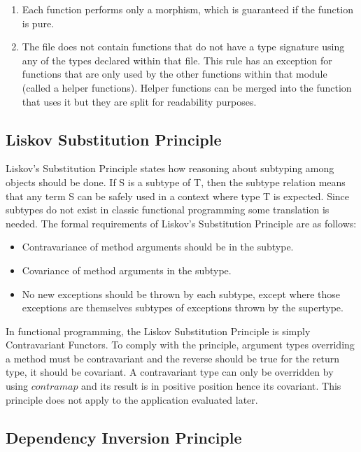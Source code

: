\begin{enumerate}
    \item Each function performs only a morphism, which is guaranteed if the
        function is pure.
    \item The file does not contain functions that do not have a type signature
        using any of the types declared within that file. This rule has
        an exception for functions that are only used by the other functions
        within that module (called a helper functions). Helper functions can be
        merged into the function that uses it but they are split for
        readability purposes.
\end{enumerate}

\subsection{Liskov Substitution Principle}

Liskov's Substitution Principle states how reasoning about subtyping among
objects should be done. If S is a subtype of T, then the subtype relation means
that any term S can be safely used in a context where type T is expected. Since
subtypes do not exist in classic functional programming some translation is
needed. The formal requirements of Liskov's Substitution Principle are as
follows:

\begin{itemize}
    \item Contravariance of method arguments should be in the subtype.
    \item Covariance of method arguments in the subtype.
    \item No new exceptions should be thrown by each subtype, except where
        those exceptions are themselves subtypes of exceptions thrown by the
        supertype.
\end{itemize}

In functional programming, the Liskov Substitution Principle is simply
Contravariant Functors.  To comply with the principle, argument types overriding
a method must be contravariant and the reverse should be true for the return
type, it should be covariant.  A contravariant type can only be overridden by
using $contramap$ and its result is in positive position hence its covariant.
This principle does not apply to the application evaluated later.

\subsection{Dependency Inversion Principle} 

